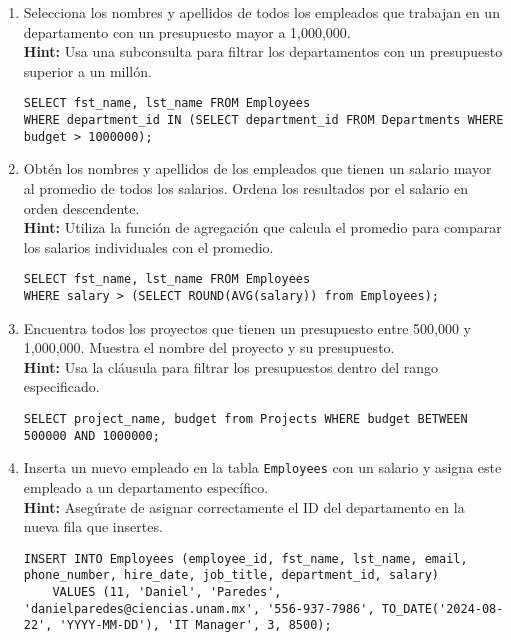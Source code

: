 \begin{enumerate}

    \item Selecciona los nombres y apellidos de todos los empleados que trabajan en un departamento con un presupuesto mayor a 1,000,000.
    \\
    \textbf{Hint:} Usa una subconsulta para filtrar los departamentos con un presupuesto superior a un millón.
    \begin{verbatim}
SELECT fst_name, lst_name FROM Employees 
WHERE department_id IN (SELECT department_id FROM Departments WHERE budget > 1000000);
    \end{verbatim}

    \item Obtén los nombres y apellidos de los empleados que tienen un salario mayor al promedio de todos los salarios. Ordena los resultados por el salario en orden descendente.
    \\
    \textbf{Hint:} Utiliza la función de agregación que calcula el promedio para comparar los salarios individuales con el promedio.
    \begin{verbatim}
SELECT fst_name, lst_name FROM Employees 
WHERE salary > (SELECT ROUND(AVG(salary)) from Employees);
    \end{verbatim}

    \item Encuentra todos los proyectos que tienen un presupuesto entre 500,000 y 1,000,000. Muestra el nombre del proyecto y su presupuesto.
    \\
        \textbf{Hint:} Usa la cláusula para filtrar los presupuestos dentro del rango especificado.
    \begin{verbatim}
SELECT project_name, budget from Projects WHERE budget BETWEEN 500000 AND 1000000;
    \end{verbatim}

    \item Inserta un nuevo empleado en la tabla \texttt{Employees} con un salario y asigna este empleado a un departamento específico.
    \\
    \textbf{Hint:} Asegúrate de asignar correctamente el ID del departamento en la nueva fila que insertes.
    \begin{verbatim}
INSERT INTO Employees (employee_id, fst_name, lst_name, email, phone_number, hire_date, job_title, department_id, salary) 
    VALUES (11, 'Daniel', 'Paredes', 'danielparedes@ciencias.unam.mx', '556-937-7986', TO_DATE('2024-08-22', 'YYYY-MM-DD'), 'IT Manager', 3, 8500);
    \end{verbatim}


\end{enumerate}
